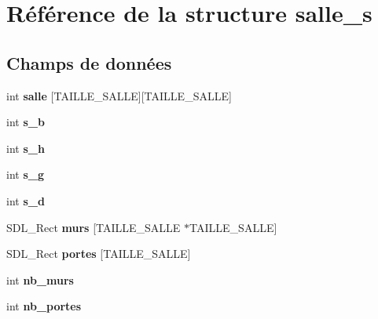\hypertarget{structsalle__s}{}\section{Référence de la structure salle\+\_\+s}
\label{structsalle__s}
\subsection*{Champs de données}
\begin{DoxyCompactItemize}
\item 
\mbox{\label{structsalle__s_a3c48c122acb80d4684fd041173ee4195}} 
int {\bfseries salle} \mbox{[}T\+A\+I\+L\+L\+E\+\_\+\+S\+A\+L\+LE\mbox{]}\mbox{[}T\+A\+I\+L\+L\+E\+\_\+\+S\+A\+L\+LE\mbox{]}
\item 
\mbox{\label{structsalle__s_ae8f4e68ca96cca0cc8cb0c44b9805871}} 
int {\bfseries s\+\_\+b}
\item 
\mbox{\label{structsalle__s_a3fb686926092e66e6f50f13af338fcde}} 
int {\bfseries s\+\_\+h}
\item 
\mbox{\label{structsalle__s_ae18bd958f7d719a0cbd50275d631c5cd}} 
int {\bfseries s\+\_\+g}
\item 
\mbox{\label{structsalle__s_a3ef26730b1c30dbcc820160dc2d7235a}} 
int {\bfseries s\+\_\+d}
\item 
\mbox{\label{structsalle__s_a39419b64ed1a04c7252e8319e3b8e328}} 
S\+D\+L\+\_\+\+Rect {\bfseries murs} \mbox{[}T\+A\+I\+L\+L\+E\+\_\+\+S\+A\+L\+LE $\ast$T\+A\+I\+L\+L\+E\+\_\+\+S\+A\+L\+LE\mbox{]}
\item 
\mbox{\label{structsalle__s_a00230727a6aa662cce254a0341c567f8}} 
S\+D\+L\+\_\+\+Rect {\bfseries portes} \mbox{[}T\+A\+I\+L\+L\+E\+\_\+\+S\+A\+L\+LE\mbox{]}
\item 
\mbox{\label{structsalle__s_a542dee312ccd6acb9fa9419f78a070c4}} 
int {\bfseries nb\+\_\+murs}
\item 
\mbox{\label{structsalle__s_a66ec62d75b2c95e9f6928f442fe262da}} 
int {\bfseries nb\+\_\+portes}

\end{DoxyCompactItemize}
